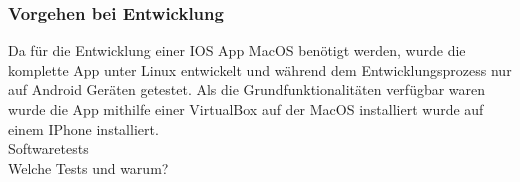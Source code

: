 \subsubsection{Vorgehen bei Entwicklung}
Da für die Entwicklung einer IOS App MacOS benötigt werden, wurde die komplette App unter Linux entwickelt und während dem Entwicklungsprozess nur auf Android Geräten getestet. Als die Grundfunktionalitäten verfügbar waren wurde die App mithilfe einer VirtualBox auf der MacOS installiert wurde auf einem IPhone installiert.\\   
Softwaretests   \\
Welche Tests und warum? \\   


    

